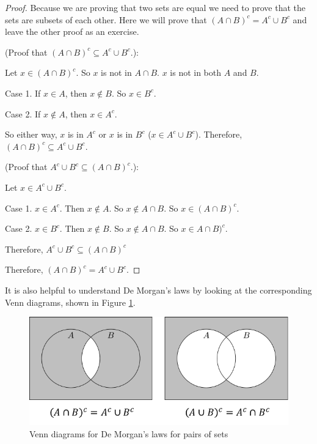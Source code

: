 \documentclass[
]{book}
\theoremstyle{definition}
\theoremstyle{definition}
\theoremstyle{definition}
\theoremstyle{remark}
\begin{document}
\begin{proof}
{} Because we are proving that two sets are equal we need to prove that the sets are subsets of each other. Here we will prove that \(\left(A \cap B\right)^c = A^c \cup B^c\) and leave the other proof as an exercise.

(Proof that \(\left(A \cap B\right)^c \subseteq A^c \cup B^c\).):

Let \(x\in \left(A \cap B\right)^c\). So \(x\) is not in \(A\cap B\). \(x\) is not in both \(A\) and \(B\).

Case 1. If \(x\in A\), then \(x\notin B\). So \(x\in B^c\).

Case 2. If \(x\notin A\), then \(x\in A^c\).

So either way, \(x\) is in \(A^c\) or \(x\) is in \(B^c\) (\(x\in A^c \cup B^c\)). Therefore, \(\left(A \cap B\right)^c \subseteq A^c \cup B^c\).

(Proof that \(A^c \cup B^c \subseteq \left(A \cap B\right)^c\).):

Let \(x \in A^c \cup B^c\).

Case 1. \(x\in A^c\). Then \(x\notin A\). So \(x\notin A\cap B\). So \(x\in (A\cap B)^c\).

Case 2. \(x\in B^c\). Then \(x\notin B\). So \(x\notin A\cap B\). So \(x\in A\cap B)^c\).

Therefore, \(A^c \cup B^c \subseteq \left(A \cap B\right)^c\)

Therefore, \(\left(A \cap B\right)^c = A^c \cup B^c\).
\end{proof}

It is also helpful to understand De Morgan's laws by looking at the corresponding Venn diagrams, shown in Figure \ref{fig:demorgan}.

\begin{figure}

{\centering \includegraphics[width=0.8\linewidth]{tikz/demorgan} 

}

\caption{Venn diagrams for De Morgan's laws for pairs of sets}\label{fig:demorgan}
\end{figure}
\end{document}
